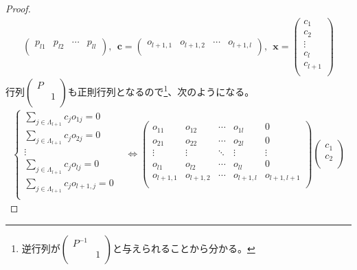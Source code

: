 \documentclass[dvipdfmx]{jsarticle}
\begin{document}
\begin{proof}
\begin{align*}
\begin{pmatrix}
p_{l1} & p_{l2} & \cdots & p_{ll} \\
\end{pmatrix},\ \ \mathbf{c} = \begin{pmatrix}
o_{l + 1,1} & o_{l + 1,2} & \cdots & o_{l + 1,l} \\
\end{pmatrix},\ \ \mathbf{x} = \begin{pmatrix}
c_{1} \\
c_{2} \\
 \vdots \\
c_{l} \\
c_{l + 1} \\
\end{pmatrix}
\end{align*}
行列$\begin{pmatrix}
P & \  \\
\  & 1 \\
\end{pmatrix}$も正則行列となるので\footnote{逆行列が$\begin{pmatrix}
  P^{- 1} & \  \\
  \  & 1 \\
  \end{pmatrix}$と与えられることから分かる。}、次のようになる。
\begin{align*}
\left\{ \begin{matrix}
\sum_{j \in \varLambda_{l + 1}} {c_{j}o_{1j}} = 0 \\
\sum_{j \in \varLambda_{l + 1}} {c_{j}o_{2j}} = 0 \\
 \vdots \\
\sum_{j \in \varLambda_{l + 1}} {c_{j}o_{lj}} = 0 \\
\sum_{j \in \varLambda_{l + 1}} {c_{j}o_{l + 1,j}} = 0 \\
\end{matrix} \right. &\Leftrightarrow \begin{pmatrix}
o_{11} & o_{12} & \cdots & o_{1l} & 0 \\
o_{21} & o_{22} & \cdots & o_{2l} & 0 \\
 \vdots & \vdots & \ddots & \vdots & \vdots \\
o_{l1} & o_{l2} & \cdots & o_{ll} & 0 \\
o_{l + 1,1} & o_{l + 1,2} & \cdots & o_{l + 1,l} & o_{l + 1,l + 1} \\
\end{pmatrix}\begin{pmatrix}
c_{1} \\
c_{2} \\

\end{pmatrix}
\end{align*}
\end{proof}
\end{document}
